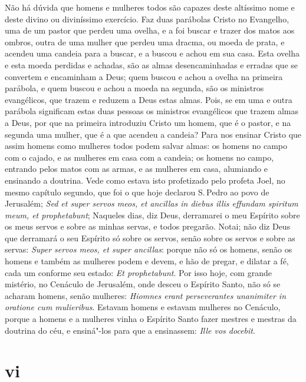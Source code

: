 Não há dúvida que homens e mulheres todos são capazes deste altíssimo
nome e deste divino ou diviníssimo exercício. Faz duas parábolas Cristo
no Evangelho, uma de um pastor que perdeu uma ovelha, e a foi buscar e
trazer dos matos aos ombros, outra de uma mulher que perdeu uma dracma,
ou moeda de prata, e acendeu uma candeia para a buscar, e a buscou e
achou em sua casa. Esta ovelha e esta moeda perdidas e achadas, são as
almas desencaminhadas e erradas que se convertem e encaminham a Deus;
quem buscou e achou a ovelha na primeira parábola, e quem buscou e achou
a moeda na segunda, são os ministros evangélicos, que trazem e reduzem a
Deus estas almas. Pois, se em uma e outra parábola significam estas duas
pessoas os ministros evangélicos que trazem almas a Deus, por que na
primeira introduziu Cristo um homem, que é o pastor, e na segunda uma
mulher, que é a que acendeu a candeia? Para nos ensinar Cristo que assim
homens como mulheres todos podem salvar almas: os homens no campo com o
cajado, e as mulheres em casa com a candeia; os homens no campo,
entrando pelos matos com as armas, e as mulheres em casa, alumiando e
ensinando a doutrina.
Vede como estava isto profetizado pelo profeta Joel, no mesmo capítulo
segundo, que foi o que hoje declarou S.\,Pedro ao povo de Jerusalém;
\emph{Sed et super servos meos, et ancillas in diebus illis effundam
spiritum meum, et prophetabunt}; Naqueles dias, diz Deus,
derramarei o meu Espírito sobre os meus servos e sobre as minhas
servas, e todos pregarão. Notai; não diz Deus que derramará o seu
Espírito só sobre os servos, senão sobre os servos e sobre as servas:
\emph{Super servos meos, et super ancillas}: porque não só os homens,
senão os homens e também as mulheres podem e devem, e hão de pregar, e
dilatar a fé, cada um conforme seu estado: \emph{Et prophetabunt}. Por
isso hoje, com grande mistério, no Cenáculo de Jerusalém, onde desceu o
Espírito Santo, não só se acharam homens, senão mulheres: \emph{Hiomnes
erant perseverantes unanimiter in oratione cum mulieribus}. Estavam
homens e estavam mulheres no Cenáculo, porque a homens e a mulheres
vinha o Espírito Santo fazer mestres e mestras da doutrina do céu, e
ensiná"-los para que a ensinassem: \emph{Ille vos docebit}.

\section*{vi}

